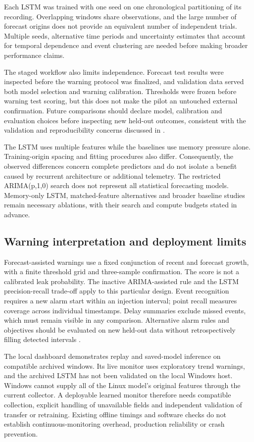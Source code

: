 \documentclass[10pt,a4paper,twocolumn]{article}
\begin{document}
Each LSTM was trained with one seed on one chronological partitioning of its recording. Overlapping windows share observations, and the large number of forecast origins does not provide an equivalent number of independent trials. Multiple seeds, alternative time periods and uncertainty estimates that account for temporal dependence and event clustering are needed before making broader performance claims.

The staged workflow also limits independence. Forecast test results were inspected before the warning protocol was finalized, and validation data served both model selection and warning calibration. Thresholds were frozen before warning test scoring, but this does not make the pilot an untouched external confirmation. Future comparisons should declare model, calibration and evaluation choices before inspecting new held-out outcomes, consistent with the validation and reproducibility concerns discussed in \cite{ref36,ref37,ref38,ref39}.

The LSTM uses multiple features while the baselines use memory pressure alone. Training-origin spacing and fitting procedures also differ. Consequently, the observed differences concern complete predictors and do not isolate a benefit caused by recurrent architecture or additional telemetry. The restricted ARIMA(p,1,0) search does not represent all statistical forecasting models. Memory-only LSTM, matched-feature alternatives and broader baseline studies remain necessary ablations, with their search and compute budgets stated in advance.

\subsection{Warning interpretation and deployment limits}

Forecast-assisted warnings use a fixed conjunction of recent and forecast growth, with a finite threshold grid and three-sample confirmation. The score is not a calibrated leak probability. The inactive ARIMA-assisted rule and the LSTM precision-recall trade-off apply to this particular design. Event recognition requires a new alarm start within an injection interval; point recall measures coverage across individual timestamps. Delay summaries exclude missed events, which must remain visible in any comparison. Alternative alarm rules and objectives should be evaluated on new held-out data without retrospectively filling detected intervals \cite{ref42,ref43,ref44}.

The local dashboard demonstrates replay and saved-model inference on compatible archived windows. Its live monitor uses exploratory trend warnings, and the archived LSTM has not been validated on the local Windows host. Windows cannot supply all of the Linux model's original features through the current collector. A deployable learned monitor therefore needs compatible collection, explicit handling of unavailable fields and independent validation of transfer or retraining. Existing offline timings and software checks do not establish continuous-monitoring overhead, production reliability or crash prevention.
\end{document}
